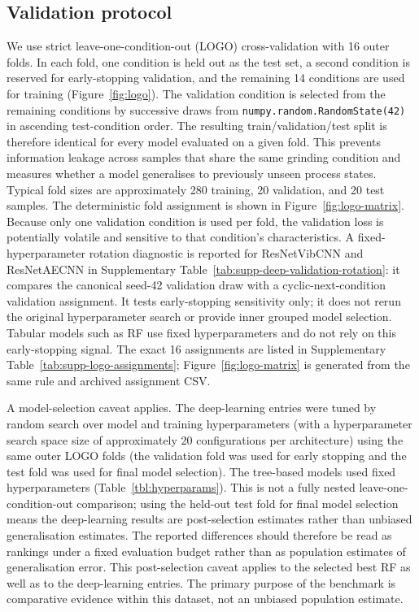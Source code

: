 \subsection{Validation protocol}\label{validation-protocol}

We use strict leave-one-condition-out (LOGO) cross-validation with 16
outer folds. In each fold, one condition is held out as the test set, a
second condition is reserved for early-stopping validation, and the
remaining 14 conditions are used for training
(Figure~\ref{fig:logo}). The validation condition is selected from the
remaining conditions by successive draws from
\texttt{numpy.random.RandomState(42)} in ascending test-condition order.
The resulting train/validation/test split is
therefore identical for every model evaluated on a given fold. This prevents
information leakage across samples that share the same grinding
condition and measures whether a model generalises to previously unseen
process states. Typical fold sizes are approximately 280 training,
20 validation, and 20 test samples. The deterministic fold assignment is
shown in Figure~\ref{fig:logo-matrix}. Because only one validation
condition is used per fold, the validation loss is potentially volatile and
sensitive to that condition's characteristics. A fixed-hyperparameter
rotation diagnostic is reported for ResNetVibCNN and ResNetAECNN in
Supplementary Table~\ref{tab:supp-deep-validation-rotation}: it compares
the canonical seed-42 validation draw with a cyclic-next-condition
validation assignment. It tests early-stopping sensitivity only; it does
not rerun the original hyperparameter search or provide inner grouped model
selection. Tabular models such as RF use fixed hyperparameters and do not
rely on this early-stopping signal.
The exact 16 assignments are listed in Supplementary
Table~\ref{tab:supp-logo-assignments}; Figure~\ref{fig:logo-matrix} is
generated from the same rule and archived assignment CSV.

A model-selection caveat applies. The deep-learning entries were tuned
by random search over model and training hyperparameters (with a hyperparameter search space size of approximately 20 configurations per architecture) using the same
outer LOGO folds (the validation fold was used for early stopping and the
test fold was used for final model selection). The tree-based models used
fixed hyperparameters (Table~\ref{tbl:hyperparams}). This is not a fully
nested leave-one-condition-out comparison; using the held-out test fold
for final model selection means the deep-learning results are
post-selection estimates rather than unbiased generalisation estimates.
The reported differences should therefore be read as rankings under a
fixed evaluation budget rather than as population estimates of
generalisation error. This post-selection caveat applies to the selected
best RF as well as to the deep-learning entries. The primary purpose of
the benchmark is comparative evidence within this dataset, not an
unbiased population estimate.


